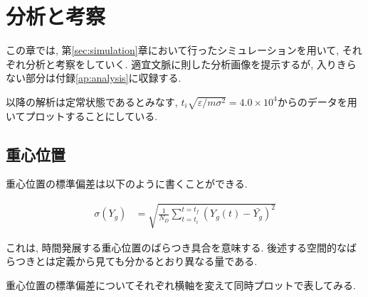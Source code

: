\chapter{分析と考察}

この章では, 第\ref{sec:simulation}章において行ったシミュレーションを用いて, それぞれ分析と考察をしていく. 適宜文脈に則した分析画像を提示するが, 入りきらない部分は付録\ref{ap:analysis}に収録する.

以降の解析は定常状態であるとみなす, $t_i \sqrt{\varepsilon / m \sigma^2} = 4.0 \times 10^{4}$からのデータを用いてプロットすることにしている.

\section{重心位置}


重心位置の標準偏差は以下のように書くことができる.

\begin{align}
  \sigma (Y_g) &= \sqrt{\frac{1}{N_{D}}\sum_{t=t_i}^{t=t_f} (Y_{g}(t) - \bar{Y_g})^2}
\end{align}

これは, 時間発展する重心位置のばらつき具合を意味する. 後述する空間的なばらつきとは定義から見ても分かるとおり異なる量である.

重心位置の標準偏差についてそれぞれ横軸を変えて同時プロットで表してみる. 

